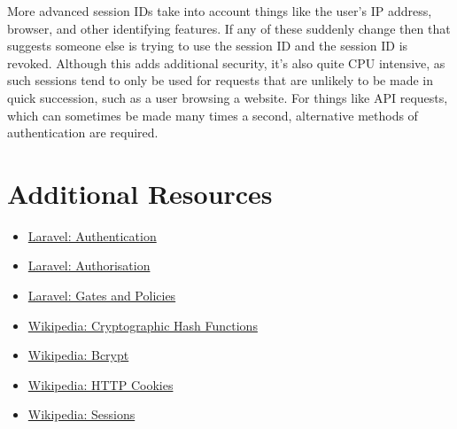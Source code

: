 More advanced session IDs take into account things like the user's IP address, browser, and other identifying features. If any of these suddenly change then that suggests someone else is trying to use the session ID and the session ID is revoked. Although this adds additional security, it's also quite CPU intensive, as such sessions tend to only be used for requests that are unlikely to be made in quick succession, such as a user browsing a website. For things like API requests, which can sometimes be made many times a second, alternative methods of authentication are required.


\section{Additional Resources}

\begin{itemize}[leftmargin=*]
    \item \href{http://laravel.com/docs/master/authentication}{Laravel: Authentication}
    \item \href{http://laravel.com/docs/master/authorization}{Laravel: Authorisation}
    \item \href{http://laravel.com/docs/master/authorization}{Laravel: Gates and Policies}
    \item \href{https://en.wikipedia.org/wiki/Cryptographic_hash_function}{Wikipedia: Cryptographic Hash Functions}
    \item \href{https://en.wikipedia.org/wiki/Bcrypt}{Wikipedia: Bcrypt}
    \item \href{https://en.wikipedia.org/wiki/HTTP_cookie}{Wikipedia: HTTP Cookies}
    \item \href{https://en.wikipedia.org/wiki/Session_(computer_science)#Server-side_web_sessions}{Wikipedia: Sessions}
\end{itemize}
